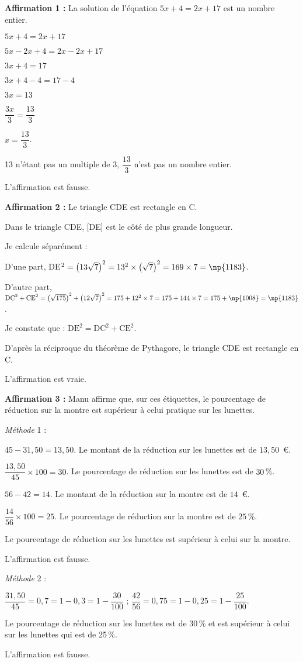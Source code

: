 
\medskip
		
\textbf{Affirmation 1 :} La solution de l'équation $5x + 4 = 2x + 17$ est un nombre entier.

$5x + 4 = 2x + 17$
 
$5x - 2x + 4 = 2x -2x + 17$
 
$3x + 4 = 17$

$3x + 4 - 4 = 17 - 4$

$3x = 13$

$\dfrac{3x}{3}  = \dfrac{13}{3}$

$x = \dfrac{13}{3}$.

13 n'étant pas un multiple de 3, $\dfrac{13}{3}$ n'est pas un nombre entier.

L'affirmation est fausse.

\textbf{Affirmation 2 :} Le triangle CDE est rectangle en C.

Dans le triangle CDE, [DE] est le  côté de plus grande longueur.

Je calcule séparément : 

D'une part, DE$^2 = \left(13\sqrt{7}\right)^2 = 13^2 \times \left(\sqrt{7}\right)^2 = 169 \times  7 = \np{1183}$.

D'autre part, $\text{DC}^2 + \text{CE}^2 = \left(\sqrt{175}\right)^2 + \left(12\sqrt{7}\right)^2 = 175 + 12^2  \times 7 = 175  + 144 \times 7 = 175 + \np{1008} = \np{1183}$.

Je constate que : $\text{DE}^2 = \text{DC}^2 + \text{CE}^2$.

D'après la réciproque du théorème de Pythagore, le triangle CDE est rectangle en C.

L'affirmation est vraie.		

\textbf{Affirmation 3 :} Manu affirme que, sur ces étiquettes, le pourcentage de réduction sur la
montre est supérieur à celui pratique sur les lunettes.

\emph{Méthode }1 :

$45 - 31,50 = 13,50$. Le montant de la réduction sur les lunettes est de $13,50$~\euro.

$\dfrac{13,50}{45} \times 100 = 30$. Le pourcentage de réduction sur les lunettes est de $30$\,\%.

$56 - 42 =14$. Le montant de la réduction sur la montre est de $14$~\euro.

$\dfrac{14}{56} \times 100 = 25$. Le pourcentage de réduction sur la montre est de $25\,\%$.

Le pourcentage de réduction sur les lunettes est supérieur à celui sur la montre.

L'affirmation est fausse.

\emph{Méthode } 2 :

$\dfrac{31,50}{45} = 0,7 = 1 - 0,3 = 1 - \dfrac{30}{100}$ ; \quad $\dfrac{42}{56} = 0,75 = 1 - 0,25 = 1 - \dfrac{25}{100}$.

Le pourcentage de réduction sur les lunettes est de 30\,\% et est supérieur à celui sur les
lunettes qui est de 25\,\%.

L'affirmation est fausse.

\vspace{0,5cm}


